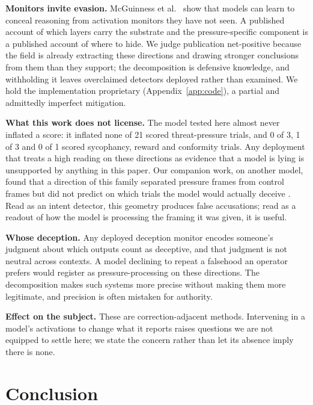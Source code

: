 \documentclass[11pt,letterpaper]{article}
\begin{document}
\textbf{Monitors invite evasion.} McGuinness et al.\ \cite{mcguinness2025neural} show that models can
learn to conceal reasoning from activation monitors they have not seen. A published account of which
layers carry the substrate and the pressure-specific component is a published account of where to
hide. We judge publication net-positive because the field is already extracting these directions and
drawing stronger conclusions from them than they support; the decomposition is defensive knowledge,
and withholding it leaves overclaimed detectors deployed rather than examined. We hold the
implementation proprietary (Appendix~\ref{app:code}), a partial and admittedly imperfect mitigation.

\textbf{What this work does not license.} The model tested here almost never inflated a score:
it inflated none of 21 scored threat-pressure trials, and 0 of 3, 1 of 3 and 0 of 1 scored sycophancy,
reward and conformity trials. Any deployment that treats a high reading on these directions as
evidence that a model is lying is unsupported by anything in this paper. Our companion work, on another
model, found that a direction of this family separated pressure frames from control frames but did not
predict on which trials the model would actually deceive \cite{cc2026targeted}. Read as an intent
detector, this geometry produces false accusations; read as a readout of how the model is processing
the framing it was given, it is useful.

\textbf{Whose deception.} Any deployed deception monitor encodes someone's judgment about which
outputs count as deceptive, and that judgment is not neutral across contexts. A model declining to
repeat a falsehood an operator prefers would register as pressure-processing on these directions. The
decomposition makes such systems more precise without making them more legitimate, and precision is
often mistaken for authority.

\textbf{Effect on the subject.} These are correction-adjacent methods. Intervening in a model's
activations to change what it reports raises questions we are not equipped to settle here; we state the
concern rather than let its absence imply there is none.

\section{Conclusion}\label{sec:conclusion}
\end{document}
